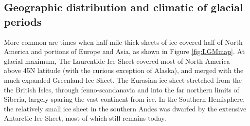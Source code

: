 \subsection{Geographic distribution and climatic of glacial periods}
More common are times when half-mile thick sheets of ice covered half of North America and portions of Europe and Asia, as shown in Figure \ref{fig:LGMmap}.  At glacial maximum, The Laurentide Ice Sheet covered most of North America above 45\textdegree N latitude (with the curious exception of Alaska), and merged with the much expanded Greenland Ice Sheet. The Eurasian ice sheet stretched from the the British Isles, through fenno-scandanavia and into the far northern limits of Siberia, largely sparing the vast continent from ice. In the Southern Hemisphere, the relatively small ice sheet in the southern Andes was dwarfed by the extensive Antarctic Ice Sheet, most of which still remains today. \\
